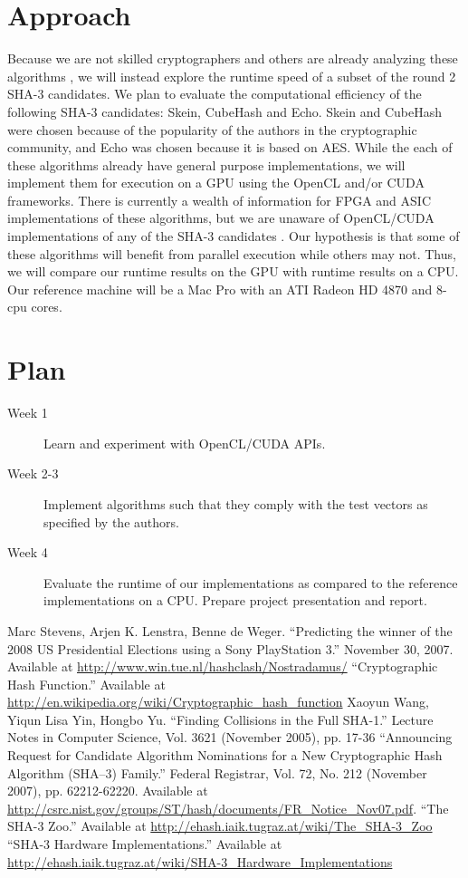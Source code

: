 \documentclass{article}
\begin{document}
\section*{Approach}
Because we are not skilled cryptographers and others are already analyzing these algorithms \cite{Sha3Zoo}, we will instead explore the runtime speed of a subset of the round 2 SHA-3 candidates.
We plan to evaluate the computational efficiency of the following SHA-3 candidates: Skein, CubeHash and Echo.
Skein and CubeHash were chosen because of the popularity of the authors in the cryptographic community, and Echo was chosen because it is based on AES.
While the each of these algorithms already have general purpose implementations, we will implement them for execution on a GPU using the OpenCL and/or CUDA frameworks.
There is currently a wealth of information for FPGA and ASIC implementations of these algorithms, but we are unaware of OpenCL/CUDA implementations of any of the SHA-3 candidates \cite{Sha3Hardware}.
Our hypothesis is that some of these algorithms will benefit from parallel execution while others may not.  
Thus, we will compare our runtime results on the GPU with runtime results on a CPU.
Our reference machine will be a Mac Pro with an ATI Radeon HD 4870 and 8-cpu cores.

\section*{Plan}
\begin{description}
  \item[Week 1] Learn and experiment with OpenCL/CUDA APIs.
  \item[Week 2-3] Implement algorithms such that they comply with the test vectors as specified by the authors.
  \item[Week 4] Evaluate the runtime of our implementations as compared to the reference implementations on a CPU. Prepare project presentation and report.
\end{description}

\begin{thebibliography}{9}
	 Marc Stevens, Arjen K. Lenstra, Benne de Weger. ``Predicting the winner of the 2008 US Presidential Elections using a Sony PlayStation 3.'' November 30, 2007. Available at \url{http://www.win.tue.nl/hashclash/Nostradamus/}
	 ``Cryptographic Hash Function.'' Available at \url{http://en.wikipedia.org/wiki/Cryptographic_hash_function}
   Xaoyun Wang, Yiqun Lisa Yin, Hongbo Yu. ``Finding Collisions in the Full SHA-1.'' Lecture Notes in Computer Science, Vol. 3621 (November 2005), pp. 17-36
 ``Announcing Request for Candidate Algorithm Nominations for a New Cryptographic Hash Algorithm (SHA–3) Family.'' Federal Registrar, Vol. 72, No. 212 (November 2007), pp. 62212-62220. Available at \url{http://csrc.nist.gov/groups/ST/hash/documents/FR_Notice_Nov07.pdf}.
   ``The SHA-3 Zoo.'' Available at \url{http://ehash.iaik.tugraz.at/wiki/The_SHA-3_Zoo}
   ``SHA-3 Hardware Implementations.'' Available at \url{http://ehash.iaik.tugraz.at/wiki/SHA-3_Hardware_Implementations}
\end{thebibliography}
\end{document}
